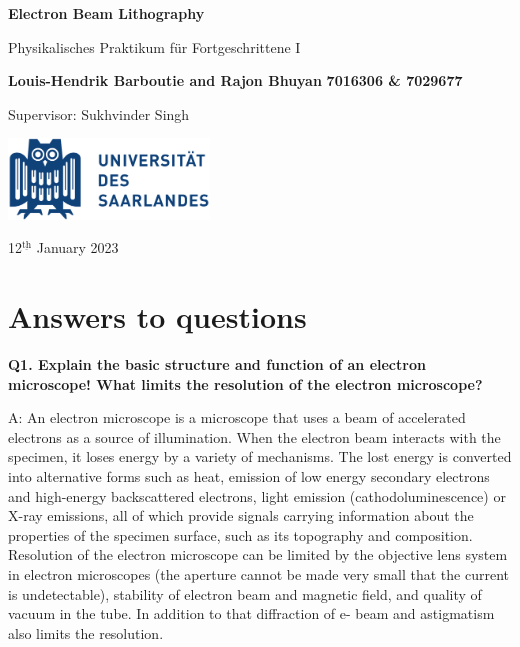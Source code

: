 \documentclass[12pt]{article}
\begin{document}
\pagestyle{fancy}
\setlength{\headheight}{15pt}

\begin{titlepage}
    \begin{center}
        \vspace*{1cm}
        \Huge
        \textbf{Electron Beam Lithography}
        
        \vspace{0.5cm}
        \LARGE
        Physikalisches Praktikum für Fortgeschrittene I
        
        \vspace{1.5cm}
        \textbf{Louis-Hendrik Barboutie and Rajon Bhuyan} \newline
        \textbf{7016306 \& 7029677}
        
        \vspace{0.5cm}
        \Large 
        Supervisor: Sukhvinder Singh
        
        \vfill

        \includegraphics[width=0.4\textwidth]{logo_uni.png}
        
        \Large
        12$^{\underline{\text{th}}}$ January 2023
    \end{center}
\end{titlepage}

\tableofcontents
\newpage

\section{Answers to questions}

\textbf{Q1. Explain the basic structure and function of an electron microscope! What limits the
resolution of the electron microscope?}

A: An electron microscope is a microscope that uses a beam of accelerated electrons as a source
of illumination. When the electron beam interacts with the specimen, it loses energy by a
variety of mechanisms. The lost energy is converted into alternative forms such as heat,
emission of low energy secondary electrons and high-energy backscattered electrons, light
emission (cathodoluminescence) or X-ray emissions, all of which provide signals carrying
information about the properties of the specimen surface, such as its topography and
composition.
Resolution of the electron microscope can be limited by the objective lens system in electron
microscopes (the aperture cannot be made very small that the current is undetectable), stability
of electron beam and magnetic field, and quality of vacuum in the tube. In addition to that
diffraction of e- beam and astigmatism also limits the resolution.
\end{document}
